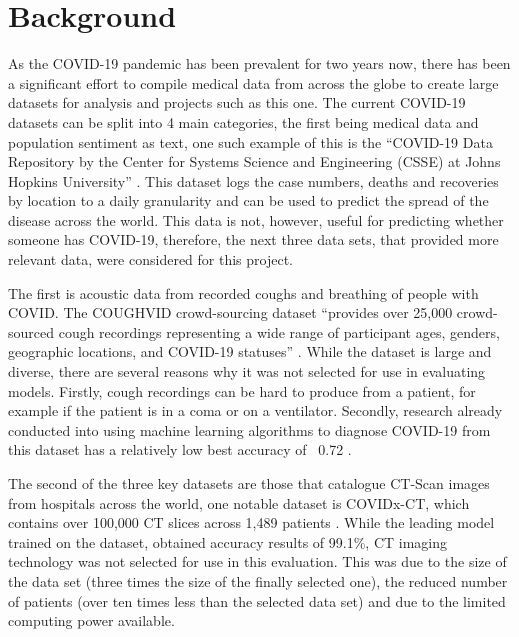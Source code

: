 \section{Background}
As the COVID-19 pandemic has been prevalent for two years now, there has been a significant effort to compile medical data from across the globe to create large datasets for analysis and projects such as this one. The current COVID-19 datasets can be split into 4 main categories, the first being medical data and population sentiment as text, one such example of this is the “COVID-19 Data Repository by the Center for Systems Science and Engineering (CSSE) at Johns Hopkins University” \citep{dong2020interactive}. This dataset logs the case numbers, deaths and recoveries by location to a daily granularity and can be used to predict the spread of the disease across the world. This data is not, however, useful for predicting whether someone has COVID-19, therefore, the next three data sets, that provided more relevant data, were considered for this project.

The first is acoustic data from recorded coughs and breathing of people with COVID. The COUGHVID crowd-sourcing dataset “provides over 25,000 crowd-sourced cough recordings representing a wide range of participant ages, genders, geographic locations, and COVID-19 statuses” \citep[pg. 1]{orlandic2021coughvid}. While the dataset is large and diverse, there are several reasons why it was not selected for use in evaluating models. Firstly, cough recordings can be hard to produce from a patient, for example if the patient is in a coma or on a ventilator. Secondly, research already conducted into using machine learning algorithms to diagnose COVID-19 from this dataset has a relatively low best accuracy of ~0.72 \citep{chang2021covnet}. 

The second of the three key datasets are those that catalogue CT-Scan images from hospitals across the world, one notable dataset is COVIDx-CT, which contains over 100,000 CT slices across 1,489 patients \citep{gunraj2020covidnet}. While the leading model trained on the dataset, obtained accuracy results of 99.1\%, CT imaging technology was not selected for use in this evaluation. This was due to the size of the data set (three times the size of the finally selected one), the reduced number of patients (over ten times less than the selected data set) and due to the limited computing power available.


